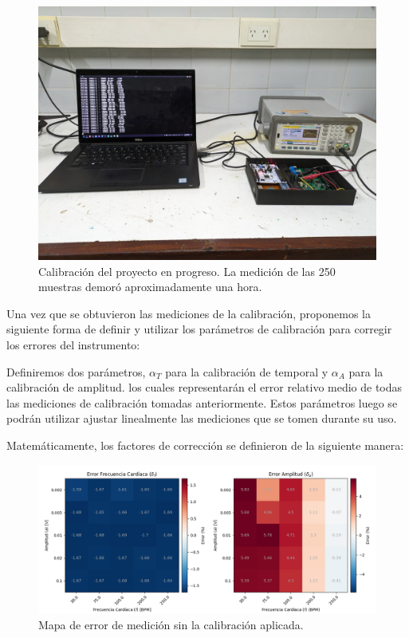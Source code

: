 \documentclass[conference]{IEEEtran}
\begin{document}
\begin{figure}[b]
    \centering
    \includegraphics[width=\linewidth]{figs/foto_calibracion.jpeg}
    \caption{Calibración del proyecto en progreso. La medición de las 250 muestras
    demoró aproximadamente una hora.}
    \label{fig:calibracion}

\end{figure}

Una vez que se obtuvieron las mediciones de la calibración, proponemos la
siguiente forma de definir y utilizar los parámetros de calibración para corregir
los errores del instrumento:

Definiremos dos parámetros, $\alpha_{T}$ para la calibración de temporal y
$\alpha_{A}$ para la calibración de amplitud. los cuales representarán
el error relativo medio de todas las mediciones de calibración tomadas
anteriormente.
Estos parámetros luego se podrán utilizar ajustar linealmente las mediciones que
se tomen durante su uso.

Matemáticamente, los factores de corrección se definieron de la siguiente manera: 


\begin{figure}[t]
    \centering
    \includegraphics[width=\textwidth]{figs/calib_error_map.png}
    \caption{Mapa de error de medición sin la calibración aplicada.}
    \label{fig:plot_errpr_sin_calib}
\end{figure}
\end{document}
